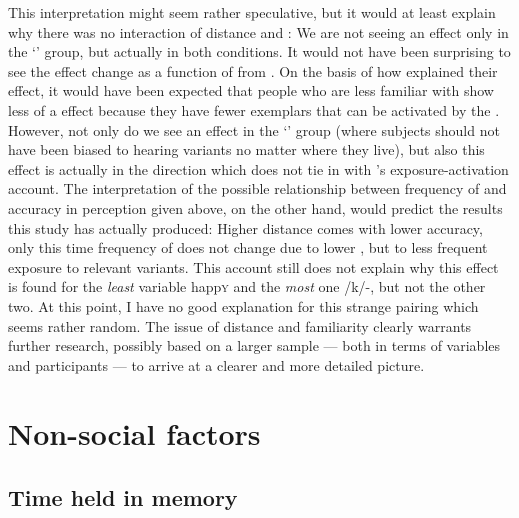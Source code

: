 This interpretation might seem rather speculative, but it would at least explain why there was no interaction of distance and : We are not seeing an effect only in the `' group, but actually in both conditions.
It would not have been surprising to see the  effect change as a function of  from .
On the basis of how \textcite{haydrager2010} explained their  effect, it would have been expected that people who are less familiar with  show less of a  effect because they have fewer exemplars that can be activated by the .
However, not only do we see an effect in the `' group (where subjects should not have been biased to hearing  variants no matter where they live), but also this effect is actually in the direction which does not tie in with \citeauthor{haydrager2010}'s exposure-activation account.
The interpretation of the possible relationship between frequency of  and accuracy in perception given above, on the other hand, would predict the results this study has actually produced: Higher distance comes with lower accuracy, only this time frequency of  does not change due to lower , but to less frequent exposure to relevant variants.
This account still does not explain why this effect is found for the \emph{least}  variable happ\textsc{y} and the \emph{most}  one /k/-, but not the other two.
At this point, I have no good explanation for this strange pairing which seems rather random.
The issue of distance and familiarity clearly warrants further research, possibly based on a larger sample --- both in terms of variables and participants --- to arrive at a clearer and more detailed picture.

	\section{Non-social factors}
		\label{sec.perc_res.disc.nonsocial}

		\subsection{Time held in memory}

